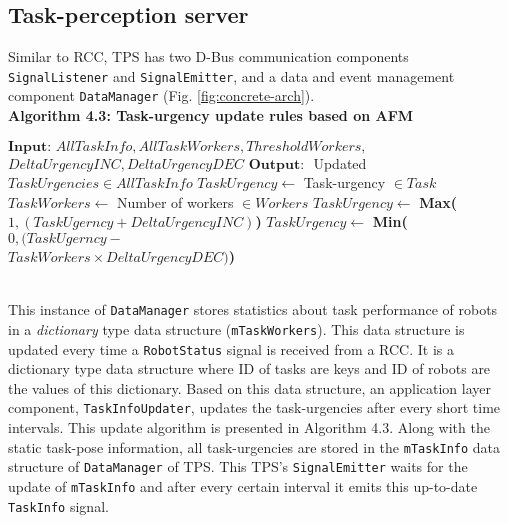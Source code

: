 \subsection{Task-perception server}
Similar to RCC,  TPS has two D-Bus communication components\\ \texttt{SignalListener} and \texttt{SignalEmitter}, and a data and event management component \texttt{DataManager} (Fig. \ref{fig:concrete-arch}).\\ 
\textbf{Algorithm 4.3: Task-urgency update rules  based on AFM}
\vspace{-3mm}
\newline
\HRule
\begin{algorithmic}[1]
\begin{small}
\label{alg:tps}
\State $\textbf{Input: } AllTaskInfo, AllTaskWorkers, ThresholdWorkers,$\\ \hspace*{1cm}$DeltaUrgencyINC, DeltaUrgencyDEC$
\State $\textbf{Output: }$ Updated $TaskUrgencies \in AllTaskInfo$
\State $ TaskUrgency \gets  $ Task-urgency $\in Task$
\State $ TaskWorkers \gets  $   Number of workers $ \in Workers$
\State $ TaskUrgency \gets $ \textbf{Max(}$1, (TaskUgerncy + DeltaUrgencyINC)$\textbf{)}
\Else
\State $ TaskUrgency \gets $ \textbf{Min(}$0, (TaskUgerncy - $\\ \hspace*{5.3cm}$ TaskWorkers  \times DeltaUrgencyDEC)$\textbf{)}
\EndIf
\EndFor
\end{small}
\end{algorithmic}
\vspace{-3mm} 
\HRule\\
This instance of \texttt{DataManager} stores statistics about task performance of robots in a \textit{dictionary} type data structure (\texttt{mTaskWorkers}). This data structure is\\ updated every time a \texttt{RobotStatus} signal is received from a RCC. It is a dictionary type data structure where ID of tasks are keys and ID of robots are the values of this dictionary. Based on this data structure, an application layer component, \texttt{TaskInfoUpdater}, updates the task-urgencies after every short time intervals. This update algorithm is presented in Algorithm 4.3.  Along with the static task-pose information, all task-urgencies are stored in the \texttt{mTaskInfo} data structure of  \texttt{DataManager} of TPS. This TPS's \texttt{SignalEmitter} waits for the update of \texttt{mTaskInfo} and after every certain interval it emits this up-to-date \texttt{TaskInfo} signal.

